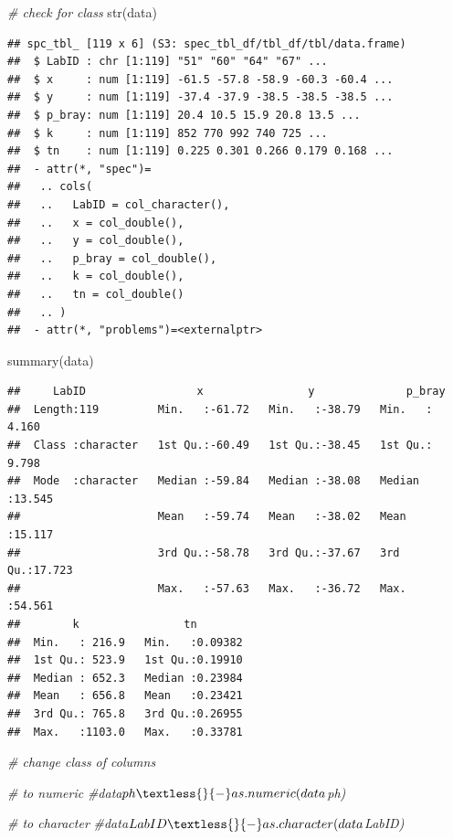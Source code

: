 \documentclass[
  10pt,
  b5paper,
  oneside]{book}
\newenvironment{Shaded}{\begin{snugshade}}{\end{snugshade}}
\newcommand{\CommentTok}[1]{\textcolor[rgb]{0.56,0.35,0.01}{\textit{#1}}}
\newcommand{\FunctionTok}[1]{\textcolor[rgb]{0.00,0.00,0.00}{#1}}
\newcommand{\NormalTok}[1]{#1}
\begin{document}
\begin{Shaded}
\begin{Highlighting}[]
\CommentTok{\# check for class}
\FunctionTok{str}\NormalTok{(data)}
\end{Highlighting}
\end{Shaded}

\begin{verbatim}
## spc_tbl_ [119 x 6] (S3: spec_tbl_df/tbl_df/tbl/data.frame)
##  $ LabID : chr [1:119] "51" "60" "64" "67" ...
##  $ x     : num [1:119] -61.5 -57.8 -58.9 -60.3 -60.4 ...
##  $ y     : num [1:119] -37.4 -37.9 -38.5 -38.5 -38.5 ...
##  $ p_bray: num [1:119] 20.4 10.5 15.9 20.8 13.5 ...
##  $ k     : num [1:119] 852 770 992 740 725 ...
##  $ tn    : num [1:119] 0.225 0.301 0.266 0.179 0.168 ...
##  - attr(*, "spec")=
##   .. cols(
##   ..   LabID = col_character(),
##   ..   x = col_double(),
##   ..   y = col_double(),
##   ..   p_bray = col_double(),
##   ..   k = col_double(),
##   ..   tn = col_double()
##   .. )
##  - attr(*, "problems")=<externalptr>
\end{verbatim}

\begin{Shaded}
\begin{Highlighting}[]
\FunctionTok{summary}\NormalTok{(data)}
\end{Highlighting}
\end{Shaded}

\begin{verbatim}
##     LabID                 x                y              p_bray      
##  Length:119         Min.   :-61.72   Min.   :-38.79   Min.   : 4.160  
##  Class :character   1st Qu.:-60.49   1st Qu.:-38.45   1st Qu.: 9.798  
##  Mode  :character   Median :-59.84   Median :-38.08   Median :13.545  
##                     Mean   :-59.74   Mean   :-38.02   Mean   :15.117  
##                     3rd Qu.:-58.78   3rd Qu.:-37.67   3rd Qu.:17.723  
##                     Max.   :-57.63   Max.   :-36.72   Max.   :54.561  
##        k                tn         
##  Min.   : 216.9   Min.   :0.09382  
##  1st Qu.: 523.9   1st Qu.:0.19910  
##  Median : 652.3   Median :0.23984  
##  Mean   : 656.8   Mean   :0.23421  
##  3rd Qu.: 765.8   3rd Qu.:0.26955  
##  Max.   :1103.0   Max.   :0.33781
\end{verbatim}

\begin{Shaded}
\begin{Highlighting}[]
\CommentTok{\# change class of columns}

\CommentTok{\# to numeric}
\CommentTok{\#data$ph \textless{}{-} as.numeric(data$ph)}

\CommentTok{\# to character}
\CommentTok{\#data$LabID \textless{}{-} as.character(data$LabID)}
\end{Highlighting}
\end{Shaded}
\end{document}

